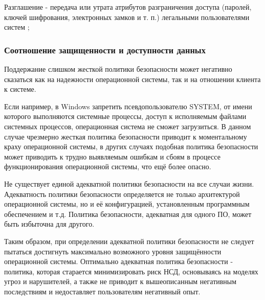 Разглашение - передача или утрата атрибутов разграничения доступа (паролей, ключей шифрования, электронных замков и т. п.) легальными пользователями систем \cite{Smirnov2007};

\subsubsection{Соотношение защищенности и доступности данных}
Поддержание слишком жесткой политики безопасности может негативно
сказаться как на надежности операционной системы,
так и на отношении клиента к системе.

Если например, в Windows запретить псевдопользователю SYSTEM, от имени которого выполняются
системные процессы, доступ к исполняемым файлами системных процессов, операционная система не
сможет загрузиться. В данном случае чрезмерно жесткая политика безопасности приводит к
моментальному краху операционной системы, в других случаях подобная политика безопасности может
приводить к трудно выявляемым ошибкам и сбоям в процессе функционирования операционной системы,
что ещё более опасно.

Не существует единой адекватной политики безопасности на все случаи жизни. Адекватность политики
безопасности определяется не только архитектурой операционной системы, но и её
конфигурацией, установленным программным обеспечением и т.д. Политика безопасности,
адекватная для одного ПО, может быть избыточна для другого.

Таким образом, при определении адекватной политики безопасности не следует пытаться достигнуть
максимально возможного уровня защищённости операционной системы. Оптимально адекватная политика
безопасности - политика, которая старается минимизировать риск НСД, основываясь на моделях угроз и нарушителей, а
также не приводит к вышеописанным негативным последствиям и недоставляет пользователям негативный опыт.

